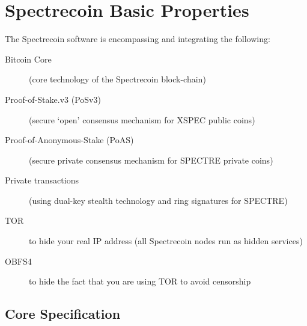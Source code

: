 \section{Spectrecoin Basic Properties}
The Spectrecoin software is encompassing and integrating the following:

\begin{description}
	\item[Bitcoin Core] (core technology of the Spectrecoin block-chain)
	\item[Proof-of-Stake.v3 (PoSv3)] (secure ‘open’ consensus mechanism for XSPEC public coins)
	\item[Proof-of-Anonymous-Stake (PoAS)] (secure private consensus mechanism for SPECTRE private coins)
	\item[Private transactions] (using dual-key stealth technology and ring signatures for SPECTRE)
	\item[TOR] to hide your real IP address (all Spectrecoin nodes run as hidden services)
	\item[OBFS4] to hide the fact that you are using TOR to avoid censorship
\end{description}



\subsection{Core Specification}

